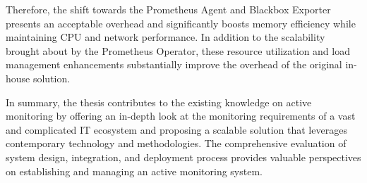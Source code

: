 Therefore, the shift towards the Prometheus Agent and Blackbox Exporter presents an acceptable overhead and significantly boosts memory efficiency while maintaining \ac{CPU} and network performance. In addition to the scalability brought about by the Prometheus Operator, these resource utilization and load management enhancements substantially improve the overhead of the original in-house solution. 

In summary, the thesis contributes to the existing knowledge on active monitoring by offering an in-depth look at the monitoring requirements of a vast and complicated IT ecosystem and proposing a scalable solution that leverages contemporary technology and methodologies. The comprehensive evaluation of system design, integration, and deployment process provides valuable perspectives on establishing and managing an active monitoring system. 